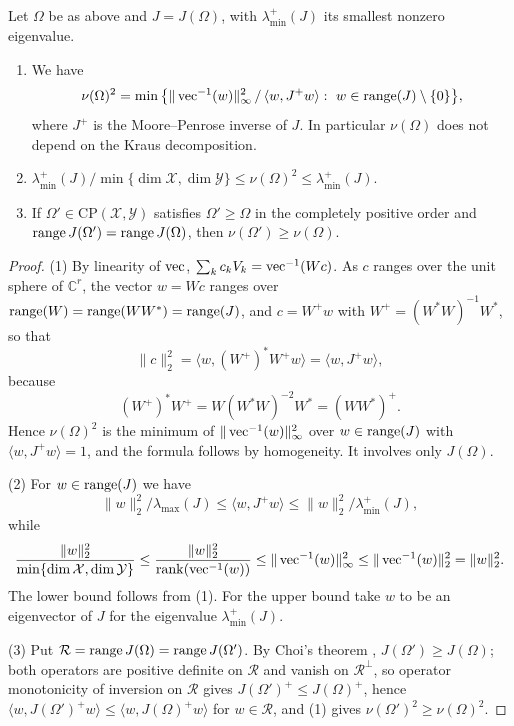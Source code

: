 \begin{lemma}\label{cont:lem:nu}
Let $\Omega$ be as above and $J=J(\Omega)$, with $\lambda^+_{\min}(J)$ its smallest nonzero eigenvalue.
\begin{enumerate}
\item We have
\[
\nu(\Omega)^2=\min\big\{\|\operatorname{vec}^{-1}(w)\|_\infty^2\,/\,\langle w,J^+w\rangle:\ w\in\operatorname{range}(J)\setminus\{0\}\big\},
\]
where $J^+$ is the Moore--Penrose inverse of $J$. In particular $\nu(\Omega)$ does not depend on the Kraus decomposition.
\item $\lambda^+_{\min}(J)/\min\{\dim\mathcal{X},\dim\mathcal{Y}\}\leq\nu(\Omega)^2\leq\lambda^+_{\min}(J)$.
\item If $\Omega'\in\mathrm{CP}(\mathcal{X},\mathcal{Y})$ satisfies $\Omega'\geq\Omega$ in the completely positive order and $\operatorname{range} J(\Omega')=\operatorname{range} J(\Omega)$, then $\nu(\Omega')\geq\nu(\Omega)$.
\end{enumerate}
\end{lemma}

\begin{proof}
(1) By linearity of $\operatorname{vec}$, $\sum_kc_kV_k=\operatorname{vec}^{-1}(Wc)$. As $c$ ranges over the unit sphere of $\mathbb{C}^r$, the vector $w=Wc$ ranges over $\operatorname{range}(W)=\operatorname{range}(WW^*)=\operatorname{range}(J)$, and $c=W^+w$ with $W^+=(W^*W)^{-1}W^*$, so that
\[
\|c\|_2^2=\langle w,(W^+)^*W^+w\rangle=\langle w,J^+w\rangle,
\]
because
\[
(W^+)^*W^+=W(W^*W)^{-2}W^*=(WW^*)^+.
\]
Hence $\nu(\Omega)^2$ is the minimum of $\|\operatorname{vec}^{-1}(w)\|_\infty^2$ over $w\in\operatorname{range}(J)$ with $\langle w,J^+w\rangle=1$, and the formula follows by homogeneity. It involves only $J(\Omega)$.

(2) For $w\in\operatorname{range}(J)$ we have
\[
\|w\|_2^2/\lambda_{\max}(J)\leq\langle w,J^+w\rangle\leq\|w\|_2^2/\lambda^+_{\min}(J),
\]
while
\[
\frac{\|w\|_2^2}{\min\{\dim\mathcal{X},\dim\mathcal{Y}\}}\leq\frac{\|w\|_2^2}{\operatorname{rank}(\operatorname{vec}^{-1}(w))}\leq\|\operatorname{vec}^{-1}(w)\|_\infty^2\leq\|\operatorname{vec}^{-1}(w)\|_2^2=\|w\|_2^2 .
\] The lower bound follows from (1). For the upper bound take $w$ to be an eigenvector of $J$ for the eigenvalue $\lambda^+_{\min}(J)$.

(3) Put $\mathcal{R}=\operatorname{range} J(\Omega)=\operatorname{range} J(\Omega')$. By Choi's theorem \cite{Choi1975}, $J(\Omega')\geq J(\Omega)$; both operators are positive definite on $\mathcal{R}$ and vanish on $\mathcal{R}^\perp$, so operator monotonicity of inversion on $\mathcal{R}$ gives $J(\Omega')^+\leq J(\Omega)^+$, hence $\langle w,J(\Omega')^+w\rangle\leq\langle w,J(\Omega)^+w\rangle$ for $w\in \mathcal{R}$, and (1) gives $\nu(\Omega')^2\geq\nu(\Omega)^2$.
\end{proof}

